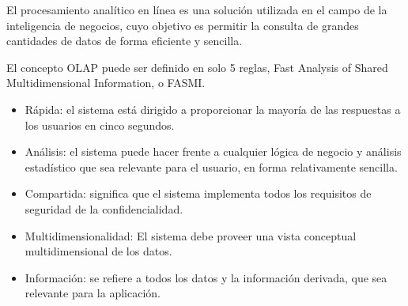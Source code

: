 \documentclass{fancyslides}
\begin{document}
\startingslide %

\begin{frame}
\end{frame}


\begin{frame}
\misc
{
  El procesamiento analítico en línea es una solución utilizada en el campo de la inteligencia de negocios, cuyo objetivo es permitir la consulta de grandes cantidades de datos de forma eficiente y sencilla.
}
\end{frame}

\begin{frame}
\misc
{
El concepto OLAP puede ser definido en solo 5 reglas, Fast Analysis of Shared Multidimensional
Information, o FASMI.
}
\end{frame}

\begin{frame}
\misc
{
\begin{itemize}
  \item Rápida: el sistema está dirigido a proporcionar la mayoría de las respuestas a los usuarios en cinco segundos.
  \item Análisis: el sistema puede hacer frente a cualquier lógica de negocio y análisis estadístico que sea relevante para el usuario, en forma relativamente sencilla.
  \item Compartida: significa que el sistema implementa todos los requisitos de seguridad de la confidencialidad.
  \item Multidimensionalidad: El sistema debe proveer una vista conceptual multidimensional de los datos.
  \item Información: se refiere a todos los datos y la información derivada, que sea relevante para la aplicación.
\end{itemize}
}
\end{frame}



\begin{frame}
\end{frame}


\begin{frame}
\end{frame}

\begin{frame}
\end{frame}

\begin{frame}
\end{frame}
\end{document}
